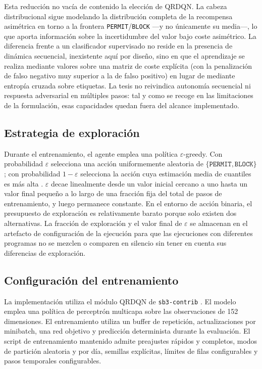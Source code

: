 Esta reducción no vacía de contenido la elección de QRDQN. La cabeza distribucional sigue modelando la distribución completa de la recompensa asimétrica en torno a la frontera \texttt{PERMIT}/\texttt{BLOCK} —y no únicamente su media—, lo que aporta información sobre la incertidumbre del valor bajo coste asimétrico. La diferencia frente a un clasificador supervisado no reside en la presencia de dinámica secuencial, inexistente aquí por diseño, sino en que el aprendizaje se realiza mediante valores sobre una matriz de coste explícita (con la penalización de falso negativo muy superior a la de falso positivo) en lugar de mediante entropía cruzada sobre etiquetas. La tesis no reivindica autonomía secuencial ni respuesta adversarial en múltiples pasos: tal y como se recoge en las limitaciones de la formulación, esas capacidades quedan fuera del alcance implementado.

\subsection{Estrategia de exploración}
Durante el entrenamiento, el agente emplea una política $\varepsilon$-greedy. Con probabilidad $\varepsilon$ selecciona una acción uniformemente aleatoria de $\{\texttt{PERMIT}, \texttt{BLOCK}\}$; con probabilidad $1-\varepsilon$ selecciona la acción cuya estimación media de cuantiles es más alta \parencite{Mnih2015DQN}. $\varepsilon$ decae linealmente desde un valor inicial cercano a uno hasta un valor final pequeño a lo largo de una fracción fija del total de pasos de entrenamiento, y luego permanece constante. En el entorno de acción binaria, el presupuesto de exploración es relativamente barato porque solo existen dos alternativas. La fracción de exploración y el valor final de $\varepsilon$ se almacenan en el artefacto de configuración de la ejecución para que las ejecuciones con diferentes programas no se mezclen o comparen en silencio sin tener en cuenta sus diferencias de exploración.

\subsection{Configuración del entrenamiento}
La implementación utiliza el módulo QRDQN de \texttt{sb3-contrib} \parencite{SB3ContribQRDQNDocs}. El modelo emplea una política de perceptrón multicapa sobre las observaciones de 152 dimensiones. El entrenamiento utiliza un buffer de repetición, actualizaciones por minibatch, una red objetivo y predicción determinista durante la evaluación. El script de entrenamiento mantenido admite preajustes rápidos y completos, modos de partición aleatoria y por día, semillas explícitas, límites de filas configurables y pasos temporales configurables.

